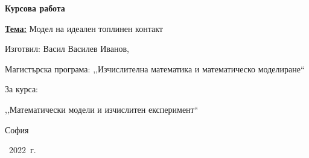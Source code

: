 \begin{titlepage}
    \thispagestyle{fancy}
    \begin{center}
        \hfill \break
        \hfill \break
        \hfill \break
        \Huge	
        \textbf{Курсова работа}\\
        \vspace{3cm}
    \end{center}
    \normalsize	
    \textbf{\underline{Тема:}} Модел на идеален топлинен контакт
    \vspace{2cm}

    \begin{flushright}
        \normalsize	
        Изготвил: Васил Василев Иванов,

        Магистърска програма: ,,Изчислителна математика и математическо моделиране``
        \vspace{1cm}

        За курса:

        ,,Математически модели и изчислитен експеримент``
    \end{flushright}

    \vspace*{\fill}
    \begin{center}
        \footnotesize	
        София

         ~2022~г.
    \end{center}
 \end{titlepage}
